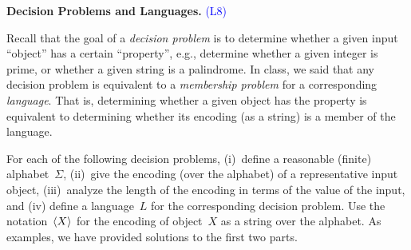 \documentclass[11pt,addpoints]{exam}
\begin{document}
\begin{questions}
    \question \textbf{Decision Problems and Languages.} \textcolor{blue}{(L8)}
    
Recall that the goal of a \emph{decision problem} is to determine whether a given input ``object'' has a certain ``property'', e.g., determine whether a given integer is prime, or whether a given string is a palindrome.
  In class, we said that any decision problem is equivalent to a \emph{membership problem} for a corresponding \emph{language}.
  That is, determining whether a given object has the property is equivalent to determining whether its encoding (as a string) is a member of the language.

  For each of the following decision problems, (i)~define a reasonable (finite) alphabet~$\Sigma$, (ii)~give the encoding (over the alphabet) of a representative input object, (iii)~analyze the length of the encoding in terms of the value of the input, and (iv) define a language~$L$ for the corresponding decision problem.
  Use the notation~$\langle X\rangle$ for the encoding of object~$X$ as a string over the alphabet.
  As examples, we have provided solutions to the first two parts. 
    
\end{questions}
\end{document}
